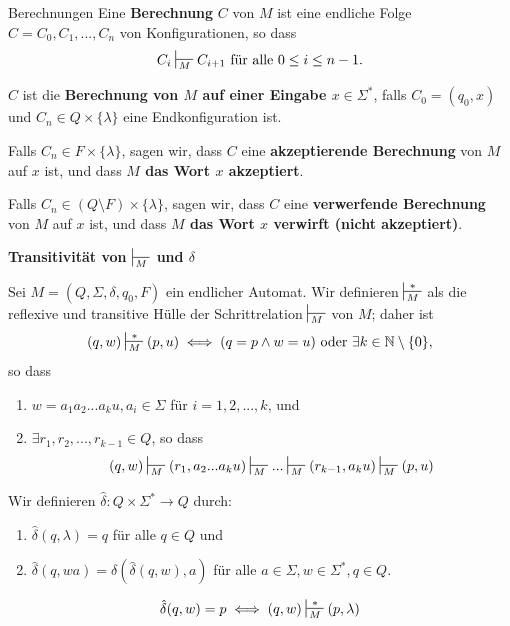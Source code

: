 \documentclass[a4paper, 11pt]{article}
\def\N{\mathbb{N}}
\newcommand\myTitle[1]{{\large \textbf {#1}}}
\begin{document}
	\begin{mainbox}{Berechnungen}
		Eine \textbf{Berechnung} $C$ von $M$ ist eine endliche Folge $C = C_0, C_1, ..., C_n$ von Konfigurationen, so dass 
		$$C_i \sststile{M}{} C_{i+1} \text{ für alle } 0 \leq i \leq n-1.$$

		$C$ ist die \textbf{Berechnung von $M$ auf einer Eingabe $x \in \Sigma^*$}, falls $C_0 = (q_0, x)$ und $C_n \in Q \times \{\lambda\}$ eine Endkonfiguration ist.
	\end{mainbox}
	Falls $C_n \in F \times \{\lambda\}$, sagen wir, dass $C$ eine \textbf{akzeptierende Berechnung} von $M$ auf $x$ ist, und dass \textbf{$M$ das Wort $x$ akzeptiert}.

	Falls $C_n \in (Q \setminus F) \times \{\lambda\}$, sagen wir, dass $C$ eine \textbf{verwerfende Berechnung} von $M$ auf $x$ ist, und dass \textbf{$M$ das Wort $x$ verwirft (nicht akzeptiert)}.



	\myTitle{Transitivität von $\sststile{M}{}$ und $\delta$}
	\begin{mainbox}{}
		Sei $M = (Q, \Sigma, \delta, q_0, F)$ ein endlicher Automat. Wir definieren $\sststile{M}{*}$ als die reflexive und transitive Hülle der Schrittrelation $\sststile{M}{}$ von $M$; daher ist
		$$(q, w) \sststile{M}{*}(p,u) \iff (q = p \land w = u) \text{ oder } \exists k \in \N\setminus\{0\},$$
		so dass 
		\begin{enumerate}[label=(\roman*)]
			\item $w = a_1a_2...a_ku, a_i \in \Sigma$ für $i = 1,2,...,k$, und
			\item $\exists r_1, r_2, ...,r_{k-1}\in Q$, so dass 
			$$(q,w) \sststile{M}{}(r_1, a_2...a_ku) \sststile{M}{}...\sststile{M}{}(r_{k-1},a_ku)\sststile{M}{}(p, u)$$
		\end{enumerate}
	\end{mainbox}
	
	\begin{mainbox}{}
		Wir definieren $\hat{\delta}: Q \times \Sigma^* \to Q$ durch:
		\begin{enumerate}[label=(\roman*)]
			\item $\hat{\delta}(q, \lambda) = q$ für alle $q \in Q$ und
			\item $\hat{\delta}(q, wa) = \delta(\hat{\delta}(q,w), a)$ für alle $a \in \Sigma, w \in \Sigma^*, q \in Q$.
		\end{enumerate}
	\end{mainbox}
	$$\hat{\delta}(q, w) = p \iff (q, w) \sststile{M}{*} (p, \lambda)$$
\end{document}
